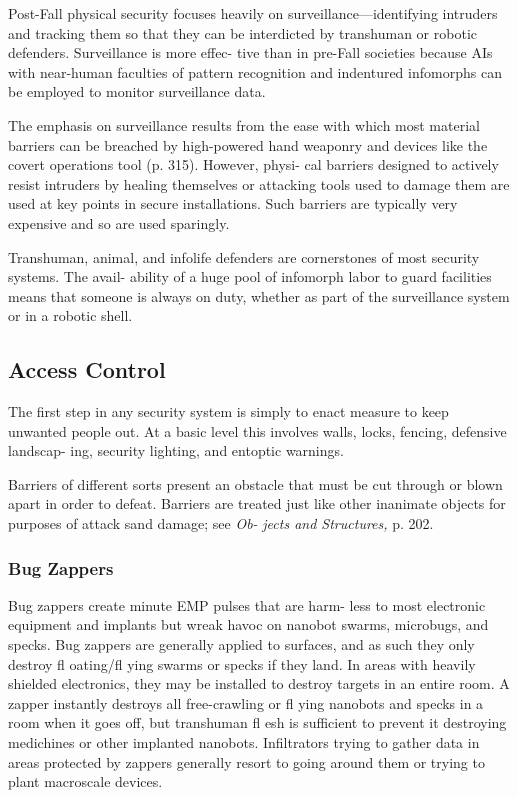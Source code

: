 Post-Fall physical security focuses heavily on 
surveillance—identifying intruders and tracking 
them so that they can be interdicted by transhuman 
or robotic defenders. Surveillance is more effec-
tive than in pre-Fall societies because AIs with 
near-human faculties of pattern recognition and 
indentured infomorphs can be employed to monitor 
surveillance data.

The emphasis on surveillance results from the ease 
with which most material barriers can be breached 
by high-powered hand weaponry and devices like 
the covert operations tool (p. 315). However, physi-
cal barriers designed to actively resist intruders by 
healing themselves or attacking tools used to damage 
them are used at key points in secure installations. 
Such barriers are typically very expensive and so are 
used sparingly.

Transhuman, animal, and infolife defenders are 
cornerstones of most security systems. The avail-
ability of a huge pool of infomorph labor to guard 
facilities means that someone is always on duty, 
whether as part of the surveillance system or in a 
robotic shell.

\subsection{Access Control}

The first step in any security system is simply to enact 
measure to keep unwanted people out. At a basic level 
this involves walls, locks, fencing, defensive landscap-
ing, security lighting, and entoptic warnings.

Barriers of different sorts present an obstacle that 
must be cut through or blown apart in order to 
defeat. Barriers are treated just like other inanimate 
objects for purposes of attack sand damage; see \textit{Ob-}
\textit{jects and Structures,} p. 202.

\subsubsection{Bug Zappers}

Bug zappers create minute EMP pulses that are harm-
less to most electronic equipment and implants but 
wreak havoc on nanobot swarms, microbugs, and 
specks. Bug zappers are generally applied to surfaces, 
and as such they only destroy fl oating/fl ying swarms 
or specks if they land. In areas with heavily shielded 
electronics, they may be installed to destroy targets 
in an entire room. A zapper instantly destroys all 
free-crawling or fl ying nanobots and specks in a room 
when it goes off, but transhuman fl esh is sufficient to 
prevent it destroying medichines or other implanted 
nanobots. Infiltrators trying to gather data in areas 
protected by zappers generally resort to going around 
them or trying to plant macroscale devices.

